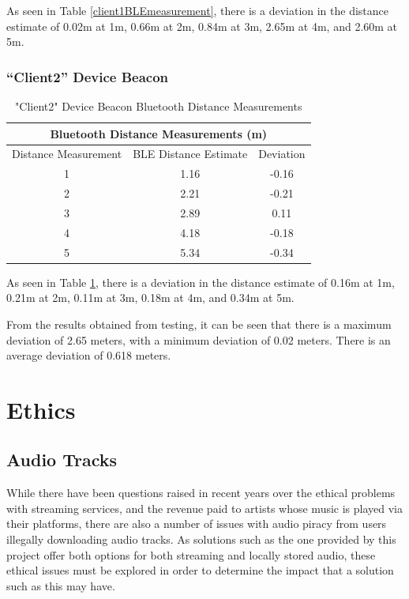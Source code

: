 \documentclass[11pt,a4paper,headinclude=false,footinclude=false]{scrreprt}
\begin{document}
As seen in Table \ref{client1BLEmeasurement}, there is a deviation in
the distance estimate of 0.02m at 1m, 0.66m at 2m, 0.84m at 3m, 2.65m at
4m, and 2.60m at 5m.

\subsection{\texorpdfstring{``Client2'' Device
Beacon}{Client2 Device Beacon}}\label{client2-device-beacon}

\begin{table}[H]
\centering
    \begin{tabular}{||c|c|c||}
    \hline
    \multicolumn{3}{|c|}{\textbf{Bluetooth Distance Measurements (m)}} \\
    \hline\hline
    Distance Measurement & BLE Distance Estimate & Deviation \\
    \hline
    1 & 1.16 & -0.16 \\
    \hline
    2 & 2.21 & -0.21 \\
    \hline
    3 & 2.89 & 0.11 \\
    \hline
    4 & 4.18 & -0.18 \\
    \hline
    5 & 5.34 & -0.34 \\
    \hline\hline
    \end{tabular}
    \caption{"Client2" Device Beacon Bluetooth Distance Measurements}
    \label{client2BLEmeasurement}
\end{table}

As seen in Table \ref{client2BLEmeasurement}, there is a deviation in
the distance estimate of 0.16m at 1m, 0.21m at 2m, 0.11m at 3m, 0.18m at
4m, and 0.34m at 5m.

From the results obtained from testing, it can be seen that there is a
maximum deviation of 2.65 meters, with a minimum deviation of 0.02
meters. There is an average deviation of 0.618 meters.

\chapter{Ethics}\label{ethics}

\section{Audio Tracks}\label{audio-tracks}

While there have been questions raised in recent years over the ethical
problems with streaming services, and the revenue paid to artists whose
music is played via their platforms, there are also a number of issues
with audio piracy from users illegally downloading audio tracks. As
solutions such as the one provided by this project offer both options
for both streaming and locally stored audio, these ethical issues must
be explored in order to determine the impact that a solution such as
this may have.
\end{document}
